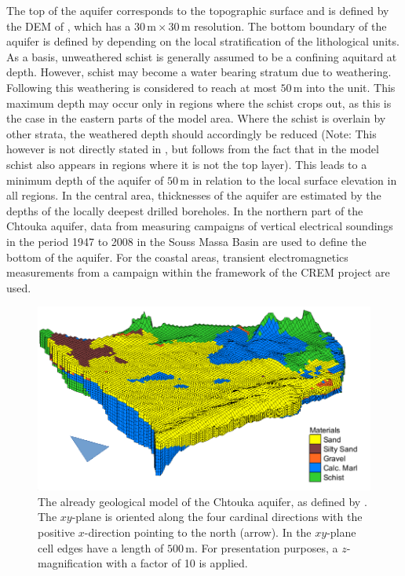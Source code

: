 The top of the aquifer corresponds to the topographic surface and is defined by the DEM of \textcite{NASA.SRTM1Arc}, which has a $30 \, \textrm{m} \times 30 \, \textrm{m}$ resolution. 
The bottom boundary of the aquifer is defined by \textcite{Horn.2021} depending on the local stratification of the lithological units. 
As a basis, unweathered schist is generally assumed to be a confining aquitard at depth. 
However, schist may become a water bearing stratum due to weathering. 
Following \textcite{McFadden.2005} this weathering is considered to reach at most $50 \, \textrm{m}$ into the unit. 
This maximum depth may occur only in regions where the schist crops out, as this is the case in the eastern parts of the model area. 
Where the schist is overlain by other strata, the weathered depth should accordingly be reduced (Note: This however is not directly stated in \textcite{Horn.2021}, but follows from the fact that in the model schist also appears in regions where it is not the top layer). 
This leads to a minimum depth of the aquifer of $50 \, \textrm{m}$ in relation to the local surface elevation in all regions. 
In the central area, thicknesses of the aquifer are estimated by the depths of the locally deepest drilled boreholes. 
In the northern part of the Chtouka aquifer, data from measuring campaigns of vertical electrical soundings in the period 1947 to 2008 in the Souss Massa Basin are used to define the bottom of the aquifer. 
For the coastal areas, transient electromagnetics measurements \parencite{Kalberkamp.2021} from a campaign within the framework of the CREM project are used.

\begin{figure}[h]
    \centering
    \includegraphics{./img/Fig-GeoMod.pdf}
    \caption{The already geological model of the Chtouka aquifer, as defined by \cite{Horn.2021}. The $xy$-plane is oriented along the four cardinal directions with the positive $x$-direction pointing to the north (arrow). In the $xy$-plane cell edges have a length of $500 \, \textrm{m}$. For presentation purposes, a $z$-magnification with a factor of 10 is applied.}
    \label{Fig-GeolMod}
\end{figure}

